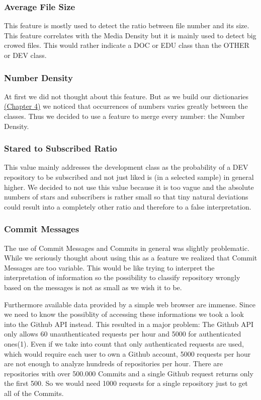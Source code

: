 \documentclass[paper=A4,pagesize=auto,12pt,headinclude=true,footinclude=true,BCOR=0mm,DIV=calc]{scrartcl}
\begin{document}
	\subsubsection{Average File Size}
	This feature is mostly used to detect the ratio between file number and its size. This feature correlates with the Media Density but it is mainly used to detect big crowed files. This would rather indicate a DOC or EDU class than the OTHER or DEV class.
	
	\subsubsection{Number Density}
	At first we did not thought about this feature. But as we build our dictionaries \hyperref[sec: dictionary]{(Chapter 4)} we noticed that occurrences of numbers varies greatly between the classes. Thus we decided to use a feature to merge every number: the Number Density.
	
	\subsubsection{Stared to Subscribed Ratio}
	This value mainly addresses the development class as the probability of a DEV repository to be subscribed and not just liked is (in a selected sample) in general higher. We decided to not use this value because it is too vague and the absolute numbers of stars and subscribers is rather small so that tiny natural deviations could result into a completely other ratio and therefore to a false interpretation.
	
	\subsubsection{Commit Messages}
	The use of Commit Messages and Commits in general was slightly problematic. While we seriously thought about using this as a feature we realized that Commit Messages are too variable. This would be like trying to interpret the interpretation of information so the possibility to classify repository wrongly based on the messages is not as small as we wish it to be.
	
	
	Furthermore available data provided by a simple web browser are immense. Since we need to know the possiblity of accessing these informations we took a look into the Github API instead. This resulted in a major problem: The Github API only allows 60 unauthenticated requests per hour and 5000 for authenticated ones(1). Even if we take into count that only authenticated requests are used, which would require each user to own a Github account, 5000 requests per hour are not enough to analyze hundreds of repositories per hour. There are repositories with over 500.000 Commits and a single Github request returns only the first 500. So we would need 1000 requests for a single repository just to get all of the Commits.
	
\end{document}
